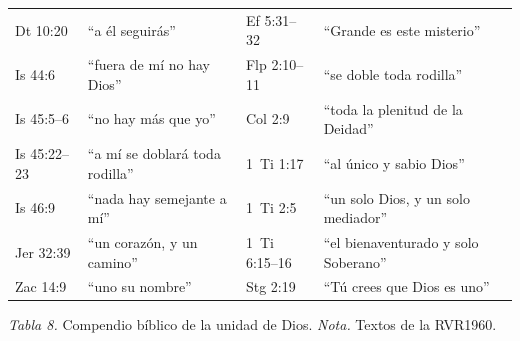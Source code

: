 \documentclass[11pt,letterpaper]{article}
\begin{document}
\begin{center}
\begin{tabular}{@{}L{2.2cm}L{5.0cm}|L{2.2cm}L{5.0cm}@{}}
Dt 10:20 & ``a él seguirás'' & Ef 5:31--32 & ``Grande es este misterio'' \\
Is 44:6 & ``fuera de mí no hay Dios'' & Flp 2:10--11 & ``se doble toda rodilla'' \\
Is 45:5--6 & ``no hay más que yo'' & Col 2:9 & ``toda la plenitud de la Deidad'' \\
Is 45:22--23 & ``a mí se doblará toda rodilla'' & 1~Ti 1:17 & ``al único y sabio Dios'' \\
Is 46:9 & ``nada hay semejante a mí'' & 1~Ti 2:5 & ``un solo Dios, y un solo mediador'' \\
Jer 32:39 & ``un corazón, y un camino'' & 1~Ti 6:15--16 & ``el bienaventurado y solo Soberano'' \\
Zac 14:9 & ``uno su nombre'' & Stg 2:19 & ``Tú crees que Dios es uno'' \\
\bottomrule
\end{tabular}\par
{\footnotesize\color{gris}\textit{Tabla 8.} Compendio bíblico de la unidad de Dios. \textit{Nota.} Textos de la RVR1960.}
\end{center}

\end{document}
